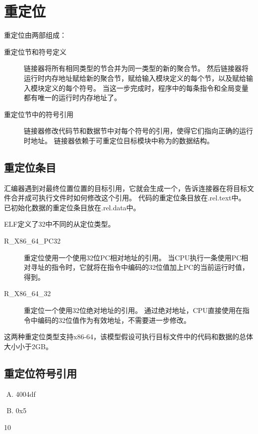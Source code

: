 
\section{重定位}
{
    重定位由两部组成：

    \begin{description}
        \item[重定位节和符号定义]
        {
            链接器将所有相同类型的节合并为同一类型的新的聚合节。
            然后链接器将运行时内存地址赋给新的聚合节，赋给输入模块定义的每个节，以及赋给输入模块定义的每个符号。
            当这一步完成时，程序中的每条指令和全局变量都有唯一的运行时内存地址了。
        }
        \item[重定位节中的符号引用]
        {
            链接器修改代码节和数据节中对每个符号的引用，使得它们指向正确的运行时地址。
            链接器依赖于可重定位目标模块中称为的数据结构。
        }
    \end{description}

    \subsection{重定位条目}
    {
        汇编器遇到对最终位置位置的目标引用，它就会生成一个，告诉连接器在将目标文件合并成可执行文件时如何修改这个引用。
        代码的重定位条目放在.rel.text中。
        已初始化数据的重定位条目放在.rel.data中。

        ELF定义了32中不同的从定位类型。

        \begin{description}
            \item[R\_X86\_64\_PC32]
            {
                重定位使用一个使用32位PC相对地址的引用。
                当CPU执行一条使用PC相对寻址的指令时，它就将在指令中编码的32位值加上PC的当前运行时值，得到。
            }
            \item[R\_X86\_64\_32]
            {
                重定位一个使用32位绝对地址的引用。
                通过绝对地址，CPU直接使用在指令中编码的32位值作为有效地址，不需要进一步修改。
            }
        \end{description}

        这两种重定位类型支持x86-64，该模型假设可执行目标文件中的代码和数据的总体大小小于2GB。
    }

    \subsection{重定位符号引用}
    {
        \begin{practicec}
            \begin{enumerate}[A.]
                \item 4004df
                \item 0x5
            \end{enumerate}
        \end{practicec}

        \begin{practicec}
            10
        \end{practicec}
    }
}
